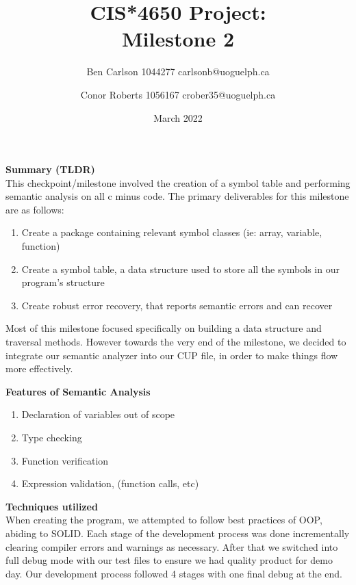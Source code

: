 \documentclass[12pt]{extarticle}
\title{CIS*4650 Project:\\ Milestone 2}
\author{
    Ben Carlson 1044277 carlsonb@uoguelph.ca \\
    \and 
    Conor Roberts 1056167  crober35@uoguelph.ca \\
}
\date{March 2022}
\begin{document}
\maketitle
\pagebreak
\textbf{Summary (TLDR)}\\

This checkpoint/milestone involved the creation of a symbol table and performing semantic analysis on all c minus code.
The primary deliverables for this milestone are as follows:

\begin{enumerate}
    \item Create a package containing relevant symbol classes (ie: array, variable, function)
    \item Create a symbol table, a data structure used to store all the symbols in our program's structure
    \item Create robust error recovery, that reports semantic errors and can recover
\end{enumerate}

Most of this milestone focused specifically on building a data structure and traversal methods. However towards the very end of the milestone, we decided to integrate our semantic analyzer into our CUP file, in order to make things flow more effectively.

\textbf{Features of Semantic Analysis} \\
\begin{enumerate}
    \item Declaration of variables out of scope
    \item Type checking
    \item Function verification
    \item Expression validation, (function calls, etc)
\end{enumerate}

\pagebreak
\textbf{Techniques utilized}
\\
When creating the program, we attempted to follow best practices of OOP, abiding to SOLID. Each stage of the development process was done incrementally clearing compiler errors and warnings as necessary. After that we switched into full debug mode with our test files to ensure we had quality product for demo day. Our development process followed 4 stages with one final debug at the end.
\end{document}
